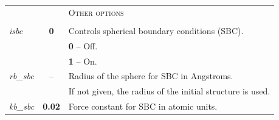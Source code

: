 \begin{tabularx}{\textwidth}{lcX}

& & \textsc{Other options} \\
& & \\
\textit{isbc }&\textbf{0} & Controls spherical boundary conditions (SBC).\\
& & \textbf{0} -- Off.\\
& & \textbf{1} -- On.\\
\textit{rb\_sbc} & -- & Radius of the sphere for SBC in Angstroms.\\
& &  If not given, the radius of the initial structure is used. \\
\textit{kb\_sbc} & \textbf{0.02} &  Force constant for SBC in atomic units. \\


\end{tabularx} 


